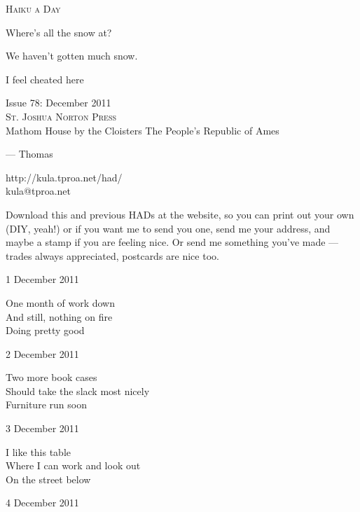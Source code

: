 \documentclass[12pt]{article}
\begin{document}
\begin{center}
{\fontsize{36}{48}\selectfont \textsc{Haiku a Day }}
\end{center}

\vspace*{3.5cm}

{\fontsize{20}{40}\selectfont 

Where's all the snow at?

We haven't gotten much snow.

I feel cheated here

}

\vspace*{5.0cm}
\begin{center}
{\large{Issue 78: December 2011}} \\[5mm]
{\fontsize{8}{8}\selectfont  \textsc{ St. Joshua Norton Press }} \\[1mm]
{\fontsize{6}{6}\selectfont Mathom House by the Cloisters \textbar The People's Republic of Ames }
\end{center}


\newpage



--- Thomas

http://kula.tproa.net/had/ \\
kula@tproa.net

Download this and previous HADs at the website, so you can
print out your own (DIY, yeah!) or if you want me to send
you one, send me your address, and maybe a stamp if you
are feeling nice. Or send me something you've made ---
trades always appreciated, postcards are nice too.

\vfill

1 December 2011

One month of work down \\
And still, nothing on fire \\
Doing pretty good

2 December 2011

Two more book cases \\
Should take the slack most nicely \\
Furniture run soon

3 December 2011

I like this table \\
Where I can work and look out \\
On the street below

\newpage

4 December 2011
\end{document}
